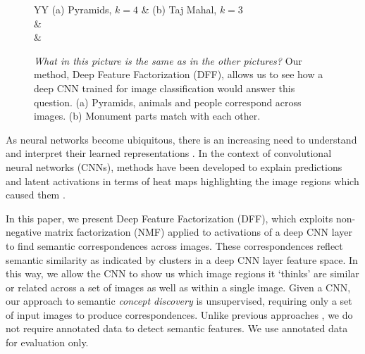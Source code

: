 \documentclass[runningheads]{llncs}
\begin{document}
	
	\begin{figure}[b]
		\centering
		\begin{tabularx}{\textwidth}{YY}
			(a) Pyramids, $k=4$ & (b) Taj Mahal, $k=3$ \\
			&  \\
			 &   \\

		\end{tabularx}
		
		\caption{\emph{What in this picture is the same as in the other pictures?} Our method,  Deep Feature Factorization (DFF), allows us to see how a deep CNN trained for image classification would answer this question. (a) Pyramids, animals and people correspond across images.  (b) Monument parts match with each other.  } \label{fig:icoseg1}

	\end{figure}
	
	As neural networks become ubiquitous, there is an increasing need to understand and interpret their learned representations \cite{Montavon2017,Ribeiro2016}. In the context of convolutional neural networks (CNNs), methods have been developed to explain predictions and latent activations in terms of heat maps highlighting the image regions which caused them \cite{Zhou2016,selvaraju2016grad}.
	
	In this paper, we present Deep Feature Factorization (DFF), which exploits non-negative matrix factorization (NMF) \cite{lee1999learning} applied to activations of a deep CNN layer to find semantic correspondences across images. These correspondences reflect semantic similarity as indicated by clusters in a deep CNN layer feature space. In this way, we allow the CNN to show us which image regions it `thinks' are similar or related across a set of images as well as within a single image. Given a CNN, our approach to semantic \emph{concept discovery} is unsupervised, requiring only a set of input images to produce correspondences. Unlike previous approaches \cite{Bau2017,Gonzalez2017},  we do not require annotated data to detect semantic features. We use annotated data for evaluation only.
	
\end{document}
